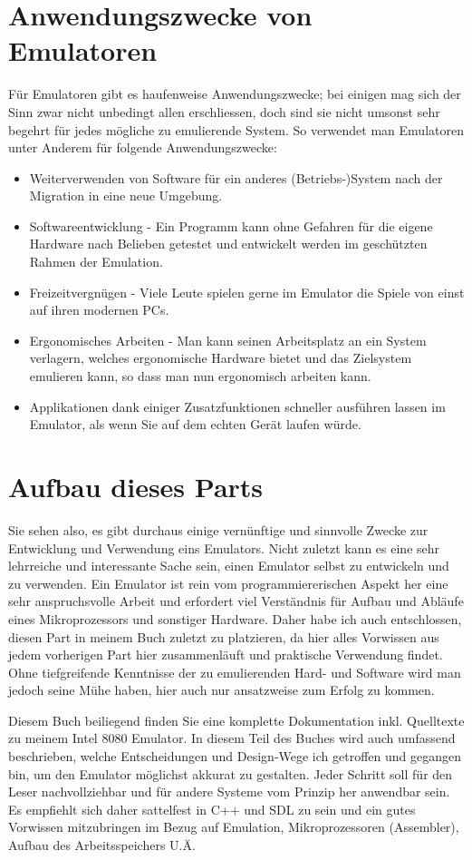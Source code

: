 \documentclass[b5paper,10pt,dvips,fleqn,titlepage,twoside]{book}
\begin{document}
\section{Anwendungszwecke von Emulatoren}
Für Emulatoren gibt es haufenweise Anwendungszwecke; bei einigen mag sich der Sinn zwar nicht unbedingt allen erschliessen, doch sind sie nicht umsonst sehr begehrt für jedes mögliche zu emulierende System.
So verwendet man Emulatoren unter Anderem für folgende Anwendungszwecke:
\newline
\begin{itemize}
\item Weiterverwenden von Software für ein anderes (Betriebs-)System nach der Migration in eine neue Umgebung.
\item Softwareentwicklung - Ein Programm kann ohne Gefahren für die eigene Hardware nach Belieben getestet und entwickelt werden im geschützten Rahmen der Emulation.
\item Freizeitvergnügen - Viele Leute spielen gerne im Emulator die Spiele von einst auf ihren modernen PCs.
\item Ergonomisches Arbeiten - Man kann seinen Arbeitsplatz an ein System verlagern, welches ergonomische Hardware bietet und das Zielsystem emulieren kann, so dass man nun ergonomisch arbeiten kann.
\item Applikationen dank einiger Zusatzfunktionen schneller ausführen lassen im Emulator, als wenn Sie auf dem echten Gerät laufen würde.
\end{itemize}
\section{Aufbau dieses Parts}
Sie sehen also, es gibt durchaus einige vernünftige und sinnvolle Zwecke zur Entwicklung und Verwendung eins Emulators.
Nicht zuletzt kann es eine sehr lehrreiche und interessante Sache sein, einen Emulator selbst zu entwickeln und zu verwenden. Ein Emulator ist rein vom programmiererischen Aspekt her eine sehr anspruchsvolle Arbeit und erfordert viel Verständnis für Aufbau und Abläufe eines Mikroprozessors und sonstiger Hardware. Daher habe ich auch entschlossen, diesen Part in meinem Buch zuletzt zu platzieren, da hier alles Vorwissen aus jedem vorherigen Part hier zusammenläuft und praktische Verwendung findet. Ohne tiefgreifende Kenntnisse der zu emulierenden Hard- und Software wird man jedoch seine Mühe haben, hier auch nur ansatzweise zum Erfolg zu kommen.

Diesem Buch beiliegend finden Sie eine komplette Dokumentation inkl. Quelltexte zu meinem Intel 8080 Emulator. In diesem Teil des Buches wird auch umfassend beschrieben, welche Entscheidungen und Design-Wege ich getroffen und gegangen bin, um den Emulator möglichst akkurat zu gestalten. Jeder Schritt soll für den Leser nachvollziehbar und für andere Systeme vom Prinzip her anwendbar sein.\newline
Es empfiehlt sich daher sattelfest in C++ und SDL zu sein und ein gutes Vorwissen mitzubringen im Bezug auf Emulation, Mikroprozessoren (Assembler), Aufbau des Arbeitsspeichers U.Ä.
\end{document}

